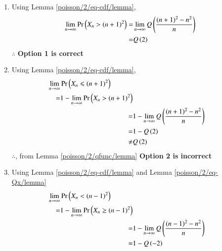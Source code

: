 \begin{enumerate}
\item Using Lemma         \ref{poisson/2/eq-cdf/lemma},
\begin{align}
    \lim \limits_{n \to \infty} \Pr\left(X_n > (n+1)^2\right) =& \lim \limits_{n \to \infty}Q \left(\frac{(n+1)^2-n^2}{n}\right)
    \\=&Q\left(2\right)
\end{align}
$\mathbf{\therefore}$ \textbf{Option 1 is correct}
\item Using Lemma         \ref{poisson/2/eq-cdf/lemma},
\begin{align}
\begin{split}
    \lim \limits_{n \to \infty} & \Pr\left(X_n \leqslant (n+1)^2\right)\\ =&1-\lim \limits_{n \to \infty}  \Pr\left(X_n > (n+1)^2\right)
\end{split}
    \\=&1- \lim \limits_{n \to \infty}Q \left(\frac{(n+1)^2-n^2}{n}\right)
    \\=&1- Q \left(2\right)
    \\ \ne &  Q\left(2\right)
\end{align}
$\mathbf{\therefore}$, from Lemma \ref{poisson/2/qfunc/lemma} \textbf{Option 2 is incorrect}
\item   Using Lemma         \ref{poisson/2/eq-cdf/lemma} and Lemma \ref{poisson/2/eq-Qx/lemma}
\begin{align}
\begin{split}
    \lim \limits_{n \to \infty} & \pr{X_n < (n-1)^2}\\ =&1-\lim \limits_{n \to \infty}  \pr{X_n \geq (n-1)^2}
\end{split}
    \\=&1-\lim \limits_{n \to \infty}Q \brak{\frac{(n-1)^2-n^2}{n}}
    \\=& 1-Q \brak{-2}

\end{align}
\end{enumerate}
